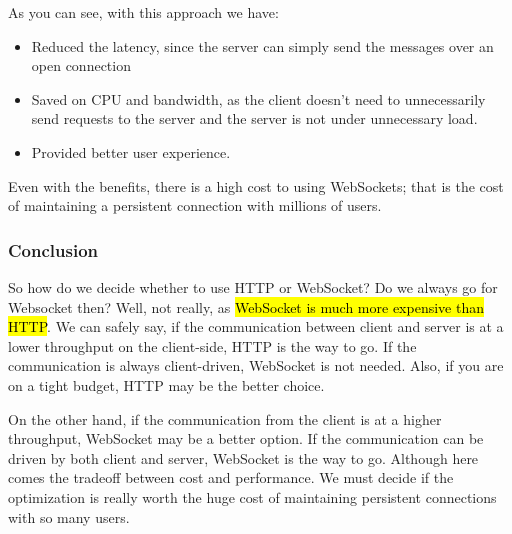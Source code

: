As you can see, with this approach we have:

\begin{itemize}
    \item Reduced the latency, since the server can simply send the messages over an open connection
    \item Saved on CPU and bandwidth, as the client doesn't need to unnecessarily send requests 
    to the server and the server is not under unnecessary load.
    \item Provided better user experience. 
\end{itemize}

Even with the benefits, there is a high cost to using WebSockets; that is the cost of maintaining a 
persistent connection with millions of users.   

\subsubsection{Conclusion}
So how do we decide whether to use HTTP or WebSocket? Do we always go for 
Websocket then? Well, not really, as \hl{WebSocket is much more expensive than 
HTTP}. We can safely say, if the communication between client and 
server is at a lower throughput on the client-side, HTTP is the 
way to go. If the communication is always client-driven, WebSocket 
is not needed. Also, if you are on a tight budget, HTTP may be the 
better choice.

On the other hand, if the communication from the client is at a 
higher throughput, WebSocket may be a better option. If the 
communication can be driven by both client and server, WebSocket 
is the way to go. Although here comes the tradeoff between cost and
 performance. We must decide if the optimization is really worth the 
 huge cost of maintaining persistent connections with so many users.

 

